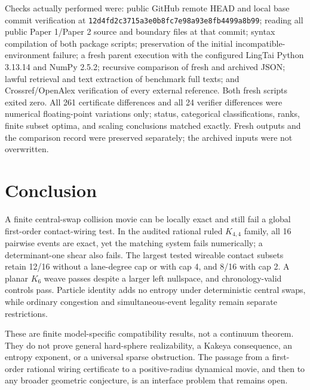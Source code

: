 \documentclass[11pt]{article}
\theoremstyle{definition}
\theoremstyle{remark}
\begin{document}
Checks actually performed were: public GitHub remote HEAD and local base commit verification at \texttt{12d4fd2c3715a3e0b8fc7e98a93e8fb4499a8b99}; reading all public Paper 1/Paper 2 source and boundary files at that commit; syntax compilation of both package scripts; preservation of the initial incompatible-environment failure; a fresh parent execution with the configured LingTai Python 3.13.14 and NumPy 2.5.2; recursive comparison of fresh and archived JSON; lawful retrieval and text extraction of benchmark full texts; and Crossref/OpenAlex verification of every external reference. Both fresh scripts exited zero. All 261 certificate differences and all 24 verifier differences were numerical floating-point variations only; status, categorical classifications, ranks, finite subset optima, and scaling conclusions matched exactly. Fresh outputs and the comparison record were preserved separately; the archived inputs were not overwritten.

\section{Conclusion}

A finite central-swap collision movie can be locally exact and still fail a global first-order contact-wiring test. In the audited rational ruled $K_{4,4}$ family, all 16 pairwise events are exact, yet the matching system fails numerically; a determinant-one shear also fails. The largest tested wireable contact subsets retain 12/16 without a lane-degree cap or with cap 4, and 8/16 with cap 2. A planar $K_6$ weave passes despite a larger left nullspace, and chronology-valid controls pass. Particle identity adds no entropy under deterministic central swaps, while ordinary congestion and simultaneous-event legality remain separate restrictions.

These are finite model-specific compatibility results, not a continuum theorem. They do not prove general hard-sphere realizability, a Kakeya consequence, an entropy exponent, or a universal sparse obstruction. The passage from a first-order rational wiring certificate to a positive-radius dynamical movie, and then to any broader geometric conjecture, is an interface problem that remains open.
\end{document}
